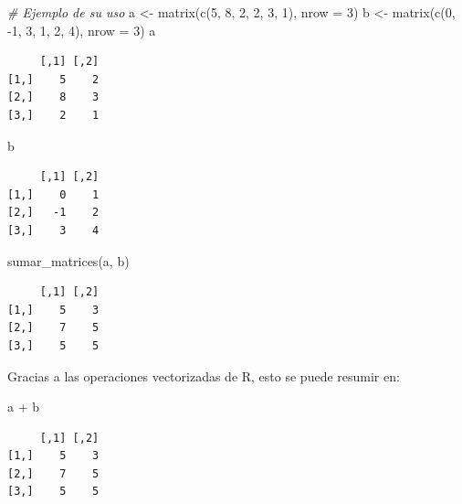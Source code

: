 \documentclass[
]{book}
\newenvironment{Shaded}{\begin{snugshade}}{\end{snugshade}}
\newcommand{\AttributeTok}[1]{\textcolor[rgb]{0.77,0.63,0.00}{#1}}
\newcommand{\CommentTok}[1]{\textcolor[rgb]{0.56,0.35,0.01}{\textit{#1}}}
\newcommand{\DecValTok}[1]{\textcolor[rgb]{0.00,0.00,0.81}{#1}}
\newcommand{\FunctionTok}[1]{\textcolor[rgb]{0.00,0.00,0.00}{#1}}
\newcommand{\NormalTok}[1]{#1}
\newcommand{\OtherTok}[1]{\textcolor[rgb]{0.56,0.35,0.01}{#1}}
\newcommand{\SpecialCharTok}[1]{\textcolor[rgb]{0.00,0.00,0.00}{#1}}
\begin{document}
\begin{itemize}
\begin{Shaded}
\begin{Highlighting}[]
\CommentTok{\# Ejemplo de su uso}
\NormalTok{a }\OtherTok{\textless{}{-}} \FunctionTok{matrix}\NormalTok{(}\FunctionTok{c}\NormalTok{(}\DecValTok{5}\NormalTok{, }\DecValTok{8}\NormalTok{, }\DecValTok{2}\NormalTok{, }\DecValTok{2}\NormalTok{, }\DecValTok{3}\NormalTok{, }\DecValTok{1}\NormalTok{), }\AttributeTok{nrow =} \DecValTok{3}\NormalTok{)}
\NormalTok{b }\OtherTok{\textless{}{-}} \FunctionTok{matrix}\NormalTok{(}\FunctionTok{c}\NormalTok{(}\DecValTok{0}\NormalTok{, }\SpecialCharTok{{-}}\DecValTok{1}\NormalTok{, }\DecValTok{3}\NormalTok{, }\DecValTok{1}\NormalTok{, }\DecValTok{2}\NormalTok{, }\DecValTok{4}\NormalTok{), }\AttributeTok{nrow =} \DecValTok{3}\NormalTok{)}
\NormalTok{a}
\end{Highlighting}
\end{Shaded}

\begin{verbatim}
     [,1] [,2]
[1,]    5    2
[2,]    8    3
[3,]    2    1
\end{verbatim}

\begin{Shaded}
\begin{Highlighting}[]
\NormalTok{b}
\end{Highlighting}
\end{Shaded}

\begin{verbatim}
     [,1] [,2]
[1,]    0    1
[2,]   -1    2
[3,]    3    4
\end{verbatim}

\begin{Shaded}
\begin{Highlighting}[]
\FunctionTok{sumar\_matrices}\NormalTok{(a, b)}
\end{Highlighting}
\end{Shaded}

\begin{verbatim}
     [,1] [,2]
[1,]    5    3
[2,]    7    5
[3,]    5    5
\end{verbatim}

  Gracias a las operaciones vectorizadas de R, esto se puede resumir en:

\begin{Shaded}
\begin{Highlighting}[]
\NormalTok{a }\SpecialCharTok{+}\NormalTok{ b}
\end{Highlighting}
\end{Shaded}

\begin{verbatim}
     [,1] [,2]
[1,]    5    3
[2,]    7    5
[3,]    5    5
\end{verbatim}
\end{itemize}
\end{document}
